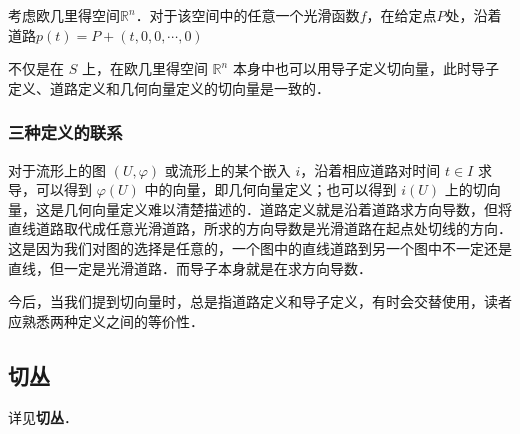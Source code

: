 考虑欧几里得空间$\mathbb{R}^n$．对于该空间中的任意一个光滑函数$f$，在给定点$P$处，沿着道路$p(t)=P+(t, 0, 0, \cdots, 0)$






不仅是在 $S$ 上，在欧几里得空间 $\mathbb{R}^n$ 本身中也可以用导子定义切向量，此时导子定义、道路定义和几何向量定义的切向量是一致的．

\subsubsection{三种定义的联系}

对于流形上的图 $(U,\varphi)$ 或流形上的某个嵌入 $i$，沿着相应道路对时间 $t\in I$ 求导，可以得到 $\varphi(U)$ 中的向量，即几何向量定义；也可以得到 $i(U)$ 上的切向量，这是几何向量定义难以清楚描述的．道路定义就是沿着道路求方向导数，但将直线道路取代成任意光滑道路，所求的方向导数是光滑道路在起点处切线的方向．这是因为我们对图的选择是任意的，一个图中的直线道路到另一个图中不一定还是直线，但一定是光滑道路．而导子本身就是在求方向导数．

今后，当我们提到切向量时，总是指道路定义和导子定义，有时会交替使用，读者应熟悉两种定义之间的等价性．

\subsection{切丛}
详见\textbf{切丛}．

